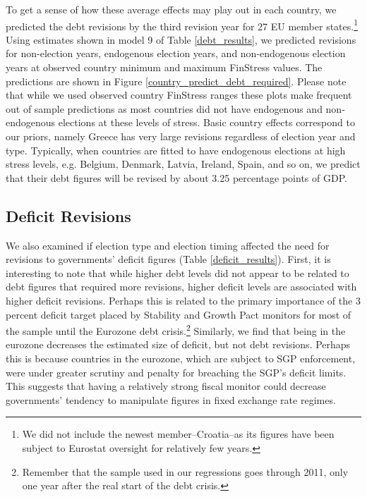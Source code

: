 \documentclass[]{article}
\begin{document}
To get a sense of how these average effects may play out in each country, we predicted the debt revisions by the third revision year for 27 EU member states.\footnote{We did not include the newest member--Croatia--as its figures have been subject to Eurostat oversight for relatively few years.} Using estimates shown in model 9 of Table \ref{debt_results}, we predicted revisions for non-election years, endogenous election years, and non-endogenous election years at observed country minimum and maximum FinStress values. The predictions are shown in Figure \ref{country_predict_debt_required}. Please note that while we used observed country FinStress ranges these plots make frequent out of sample predictions as most countries did not have endogenous and non-endogenous elections at these levels of stress. Basic country effects correspond to our priors, namely Greece has very large revisions regardless of election year and type. Typically, when countries are fitted to have endogenous elections at high stress levels, e.g. Belgium, Denmark, Latvia, Ireland, Spain, and so on, we predict that their debt figures will be revised by about 3.25 percentage points of GDP.

\subsection{Deficit Revisions}

We also examined if election type and election timing affected the need for revisions to governments' deficit figures (Table \ref{deficit_results}). First, it is interesting to note that while higher debt levels did not appear to be related to debt figures that required more revisions, higher deficit levels are associated with higher deficit revisions. Perhaps this is related to the primary importance of the 3 percent deficit target placed by Stability and Growth Pact monitors for most of the sample until the Eurozone debt crisis.\footnote{Remember that the sample used in our regressions goes through 2011, only one year after the real start of the debt crisis.} Similarly, we find that being in the eurozone decreases the estimated size of deficit, but not debt revisions. Perhaps this is because countries in the eurozone, which are subject to SGP enforcement, were under greater scrutiny and penalty for breaching the SGP's deficit limits. This suggests that having a relatively strong fiscal monitor could decrease governments' tendency to manipulate figures in fixed exchange rate regimes.
\end{document}

